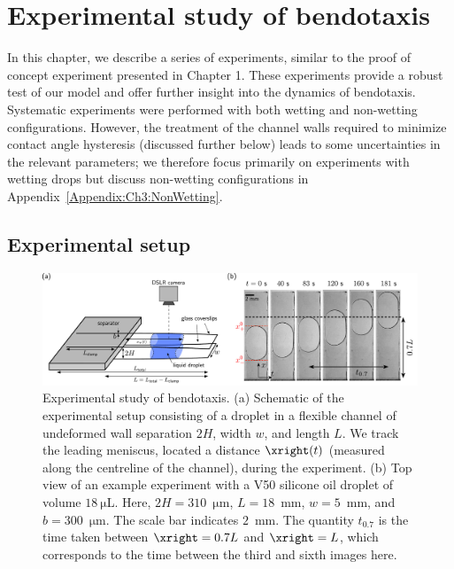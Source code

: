 \graphicspath{{./Sections/Chapter3_experiments/Figures/}}

\chapter{Experimental study of bendotaxis}
In this chapter, we describe a series of experiments, similar to the proof of concept experiment presented in Chapter 1. These experiments provide a robust test of our model and offer further insight into the dynamics of bendotaxis. Systematic experiments were performed with both wetting and non-wetting configurations. However, the treatment of the channel walls required to minimize contact angle hysteresis (discussed further below) leads to some uncertainties in the relevant parameters; we therefore focus primarily on experiments with wetting drops but discuss non-wetting configurations in Appendix~\ref{Appendix:Ch3:NonWetting}. %

\section{Experimental setup}\label{S:Ch3:ExperimentalSetup}
\begin{figure}
\centering
\includegraphics[width = \textwidth]{ExptSetup}
\caption{Experimental study of bendotaxis. (a) Schematic of the experimental setup consisting of a droplet in a flexible channel of undeformed wall separation $2H$, width $w$, and length $L$. We track the leading meniscus, located a distance $\xright(t)$ (measured along the centreline of the channel), during the experiment. (b) Top view of an example experiment with a V50 silicone oil droplet of volume $18~\si{\micro}$L. Here, $2H = 310$~$\si{\micro}$m, $L = 18$~mm, $w = 5$~mm,  and $b = 300$~$\si{\micro}$m. The scale bar indicates $2$~mm. The quantity $t_{0.7}$ is the time taken between $\xright = 0.7L$ and $\xright = L$, which corresponds to the time between the third and sixth images here.}
\label{fig:Ch3:ExptSetup}
\end{figure}
